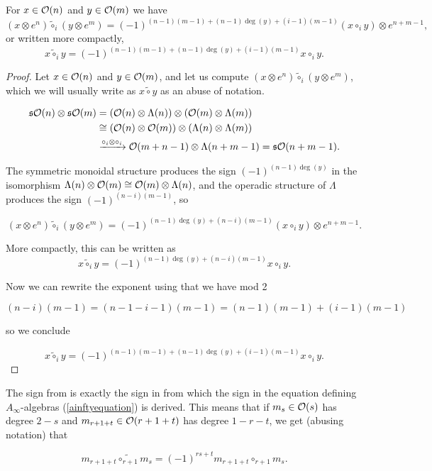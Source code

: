\documentclass[Thesis.tex]{subfiles}
\begin{document}
\begin{lem}\label{tilde}
For $x\in{\mathcal O}(n)$ and $y\in{\mathcal O}(m)$ we have
\[(x\otimes e^n)\tilde{\circ}_i(y\otimes e^m)=(-1)^{(n-1)(m-1)+(n-1)\deg(y)+(i-1)(m-1)}(x\circ_i y)\otimes e^{n+m-1},\]
or written more compactly,
\[x\tilde{\circ}_iy=(-1)^{(n-1)(m-1)+(n-1)\deg(y)+(i-1)(m-1)}x\circ_i y.\]
\end{lem}
\begin{proof}
Let $x\in{\mathcal O}(n)$ and $y\in{\mathcal O}(m)$, and let us compute $(x\otimes e^n)\tilde{\circ}_i (y\otimes e^m)$, which we will usually write as $x\tilde{\circ}y$ as an abuse of notation.

\begin{align*}
\mathfrak{s}{\mathcal O}(n)\otimes\mathfrak{s}{\mathcal O}(m)&=({\mathcal O}(n)\otimes\Lambda(n))\otimes ({\mathcal O}(m)\otimes\Lambda(m))\\
&\cong ({\mathcal O}(n)\otimes {\mathcal O}(m))\otimes (\Lambda(n)\otimes \Lambda(m))\\
&\xrightarrow{\circ_i\otimes\circ_i} {\mathcal O}(m+n-1)\otimes \Lambda(n+m-1)=\mathfrak{s}{\mathcal O}(n+m-1).
\end{align*}

The symmetric monoidal structure produces the sign $(-1)^{(n-1)\deg(y)}$ in the isomorphism $\Lambda(n)\otimes {\mathcal O}(m)\cong{\mathcal O}(m)\otimes\Lambda(n)$, and the operadic structure of $\Lambda$ produces the sign $(-1)^{(n-i)(m-1)}$, so 

\[(x\otimes e^n)\tilde{\circ}_i(y\otimes e^m)=(-1)^{(n-1)\deg(y)+(n-i)(m-1)}(x\circ_i y)\otimes e^{n+m-1}.\]

More compactly, this can be written as
\begin{equation}\label{tildecircle}
x\tilde{\circ}_iy=(-1)^{(n-1)\deg(y)+(n-i)(m-1)}x\circ_i y.
\end{equation}

Now we can rewrite the exponent using that we have mod 2

\[(n-i)(m-1)=(n-1-i-1)(m-1)=(n-1)(m-1)+(i-1)(m-1)\]

so we conclude 

\[x\tilde{\circ}_iy=(-1)^{(n-1)(m-1)+(n-1)\deg(y)+(i-1)(m-1)}x\circ_i y.\]
\end{proof}

\begin{remark}
The sign from  is exactly the sign in \cite{RW} from which the sign in the equation defining $A_\infty$-algebras (\cref{ainftyequation}) is derived. This means that if $m_s\in{\mathcal O}(s)$ has degree $2-s$ and $m_{r+1+t}\in {\mathcal O}(r+1+t)$ has degree $1-r-t$, we get (abusing notation) that

\[m_{r+1+t}\tilde{\circ_{r+1}}m_s=(-1)^{rs+t}m_{r+1+t}\circ_{r+1}m_s.\]
\end{remark}
\end{document}
